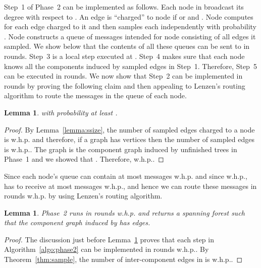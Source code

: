 \documentclass[11pt]{article}
\newtheorem{lemma}[theorem]{Lemma}
\begin{document}
Step~1 of Phase~2 can be implemented as follows. 
Each node in  broadcast its degree with respect to . 
An edge  is ``charged'' to node  if  or  and . 
Node  computes  for each edge  charged to it and then samples each  independently  with probability . 
Node  constructs a queue of messages intended for node  consisting of all edges it sampled. 
We show below that the contents of all these queues can be sent to  in  rounds. 
Step~3 is a local step executed at . 
Step~4 makes sure that each node knows all the components induced by sampled edges in Step~1. 
Therefore, Step~5 can be executed in  rounds. 
We now show that Step~2 can be implemented in  rounds by proving the following claim and then appealing to Lenzen's routing algorithm to route the messages in the queue of each node.  
\begin{lemma}
  \label{lemma:p2sample}
   with probability at least .
\end{lemma}
\begin{proof}
  By Lemma~\ref{lemma:ssize}, the number of sampled edges charged to a node is  w.h.p. and therefore, 
  if a graph has  vertices then the number of sampled edges is  w.h.p.. 
   The graph  is the component graph induced by unfinished trees in Phase~1 and we showed that . 
   Therefore,  w.h.p..
\end{proof}
\noindent Since each node's queue can contain at most  messages w.h.p. and since  w.h.p.,  has to receive at most  messages w.h.p., and hence we can route these messages in  rounds w.h.p. by using Lenzen's routing algorithm. 

\begin{lemma}
  \label{lemma:phase2}
  Phase~2 runs in  rounds w.h.p. and returns a spanning forest  such that the component graph  induced by  has  edges.
\end{lemma}
\begin{proof}
  The discussion just before Lemma~\ref{lemma:p2sample} proves that each step in Algorithm~\ref{algo:phase2} can be implemented in  rounds w.h.p.. 
  By Theorem~\ref{thm:sample}, the number of inter-component edges in  is  w.h.p..
\end{proof}
\end{document}
